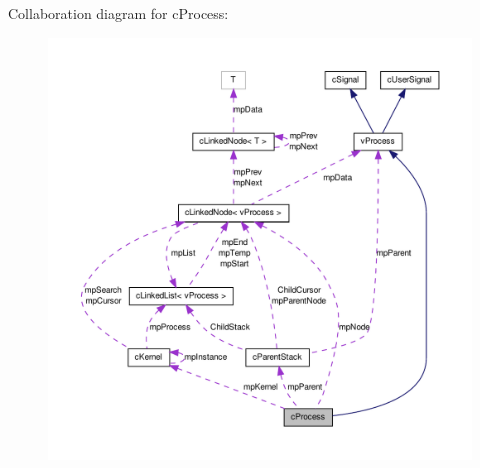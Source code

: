 Collaboration diagram for cProcess:
\nopagebreak
\begin{figure}[H]
\begin{center}
\leavevmode
\includegraphics[width=400pt]{classc_process__coll__graph}
\end{center}
\end{figure}
